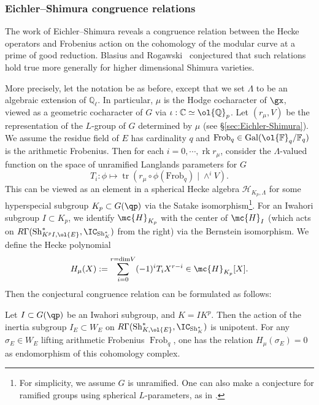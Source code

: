 \documentclass[letterpaper,11pt]{amsart}
\begin{document}
\subsubsection{Eichler--Shimura congruence relations}
The work of Eichler--Shimura reveals a congruence relation between the Hecke operators and Frobenius action on the cohomology of the modular curve at a prime of good reduction. Blasius and Rogawski~\cite{Blasius-Rogawski} conjectured that such relations hold true more generally for higher dimensional Shimura varieties. 

More precisely, let the notation be as before, except that we set $\Lambda$ to be an algebraic extension of $\mathbb{Q}_{\ell}$. In particular, $\mu$ is the Hodge cocharacter of $\gx$, viewed as a geometric cocharacter of $G$ via $\iota:\mathbb{C}\simeq \ol{\mathbb{Q}}_p$. Let $(r_\mu, V)$ be the representation of the $L$-group of $G$ determined by $\mu$ (see \S\ref{sec:Eichler-Shimura}). We assume the residue field of $E$ has cardinality $q$ and $\operatorname{Frob}_q\in \operatorname{Gal}(\ol{\mathbb{F}}_q/\mathbb{F}_q)$ is the arithmetic Frobenius. Then for each $i=0,\cdots,\operatorname{rk} r_\mu$, consider the $\Lambda$-valued function on the space of unramified Langlands parameters for $G$ 
\[T_i: \phi\mapsto \operatorname{tr}(r_\mu \circ\phi(\mathrm{Frob}_q)\mid \wedge^i V).\]
This can be viewed as an element in a spherical Hecke algebra $\mathcal{H}_{K_p,\Lambda}$ for some hyperspecial subgroup $K_p\subset G(\qp)$ via the Satake isomorphism\footnote{For simplicity, we assume $G$ is unramified. One can also make a conjecture for ramified groups using spherical $L$-parameters, as in \cite{vdHove}.}. For an Iwahori subgroup $I\subset K_p$, we identify $\mc{H}_{K_p}$ with the center of $\mc{H}_I$ (which acts on $R\Gamma(\mathrm{Sh}^*_{K^pI, \ol{E}}, 
\IC_{\mathrm{Sh}^*_{K}})$ from the right) via the Bernstein isomorphism. We define the Hecke polynomial 
\[H_\mu(X):=\sum_{i=0}^{r=\mathrm{dim}V} (-1)^i T_iX^{r-i}\in \mc{H}_{K_p}[X].\] 
Then the conjectural congruence relation can be formulated as follows:

\begin{conjecture}\label{conj: ES}
Let $I\subset G(\qp)$ be an Iwahori subgroup, and $K=IK^p$. Then the action of the inertia subgroup $I_E\subset W_E$ on $R\Gamma(\mathrm{Sh}^*_{K, \ol{E}}, 
\IC_{\mathrm{Sh}^*_{K}})$ is unipotent. For any $\sigma_E\in W_E$ lifting arithmetic Frobenius $\operatorname{Frob}_q$, one has the relation $H_\mu(\sigma_E)=0$ as endomorphism of this cohomology complex.
\end{conjecture}
\end{document}
